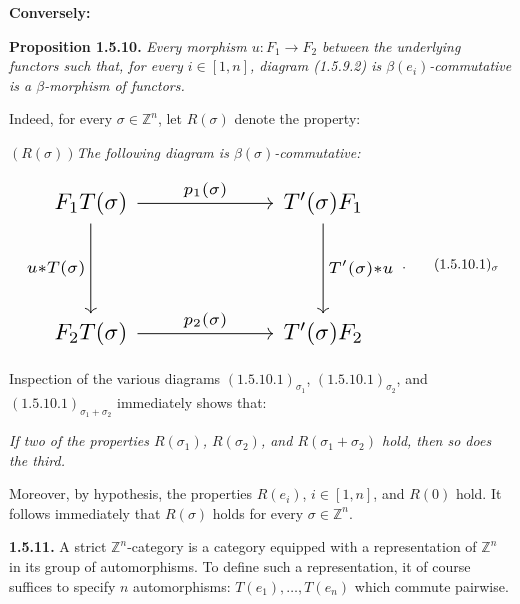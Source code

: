 %
\noindent\textbf{Conversely:}\par

\noindent\textbf{Proposition 1.5.10.}\quad
\emph{Every morphism $u\colon F_1\to F_2$ between the underlying
functors such that, for every $i\in[1,n]$, diagram (1.5.9.2) is
$\beta(e_i)$-commutative is a $\beta$-morphism of functors.}

Indeed, for every $\sigma\in\mathbb Z^n$, let $R(\sigma)$ denote the
property:

\noindent\emph{$(R(\sigma))$\qquad The following diagram is
$\beta(\sigma)$-commutative:}

\begin{equation}
  \resizebox{0.78\textwidth}{!}{%
    $\begin{tikzcd}[ampersand replacement=\&,column sep=6em,row sep=4em]
      F_1T(\sigma)
        \arrow[r,"{p_1(\sigma)}"]
        \arrow[d,"{u*T(\sigma)}"']
        \& T'(\sigma)F_1
          \arrow[d,"{T'(\sigma)*u}"] \\
      F_2T(\sigma)
        \arrow[r,"{p_2(\sigma)}"]
        \& T'(\sigma)F_2
    \end{tikzcd}$%
  }\;.
  \tag*{\ensuremath{(1.5.10.1)_{\sigma}}}
\end{equation}

Inspection of the various diagrams
$(1.5.10.1)_{\sigma_1}$, $(1.5.10.1)_{\sigma_2}$, and
$(1.5.10.1)_{\sigma_1+\sigma_2}$ immediately shows that:

\noindent\emph{If two of the properties $R(\sigma_1)$,
$R(\sigma_2)$, and $R(\sigma_1+\sigma_2)$ hold, then so does the
third.}

Moreover, by hypothesis, the properties $R(e_i)$, $i\in[1,n]$, and
$R(0)$ hold. It follows immediately that $R(\sigma)$ holds for every
$\sigma\in\mathbb Z^n$.

\noindent\textbf{1.5.11.}\quad
A strict $\mathbb Z^n$-category is a category equipped with a
representation of $\mathbb Z^n$ in its group of automorphisms. To define
such a representation, it of course suffices to specify $n$
automorphisms:
$T(e_1),\ldots,T(e_n)$ which commute pairwise.

